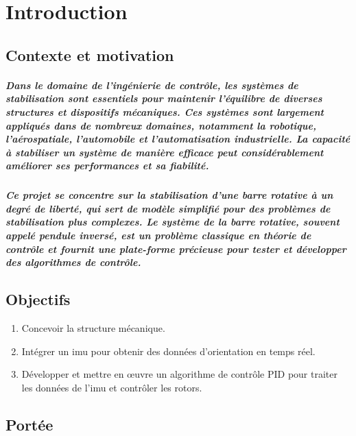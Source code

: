 \chapter{Introduction}
\label{cp:introduction}


\section{Contexte et motivation}
\paragraph{Dans le domaine de l'ingénierie de contrôle, les systèmes de stabilisation sont essentiels pour maintenir l'équilibre de diverses structures et dispositifs mécaniques. Ces systèmes sont largement appliqués dans de nombreux domaines, notamment la robotique, l'aérospatiale, l'automobile et l'automatisation industrielle. La capacité à stabiliser un système de manière efficace peut considérablement améliorer ses performances et sa fiabilité.}
\paragraph{Ce projet se concentre sur la stabilisation d'une barre rotative à un degré de liberté, qui sert de modèle simplifié pour des problèmes de stabilisation plus complexes. Le système de la barre rotative, souvent appelé pendule inversé, est un problème classique en théorie de contrôle et fournit une plate-forme précieuse pour tester et développer des algorithmes de contrôle.}

\section{Objectifs}
\begin{enumerate}
	\item Concevoir la structure mécanique.
	\item Intégrer un \gls{imu} pour obtenir des données d'orientation en temps réel.
	\item Développer et mettre en œuvre un algorithme de contrôle PID pour traiter les données de l'\gls{imu} et contrôler les rotors.
\end{enumerate}

\newpage

\section{Portée}

